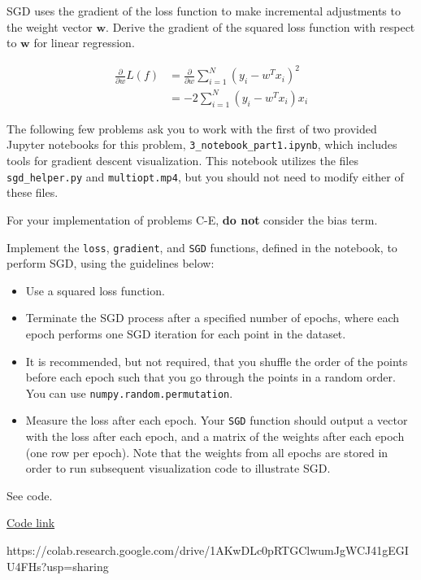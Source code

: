 \begin{problem}[2]
  SGD uses the gradient of the loss function to make incremental adjustments to the weight vector $\mathbf{w}$. Derive the gradient of the squared loss function with respect to $\mathbf{w}$ for linear regression.
\end{problem}
\begin{solution}
  \begin{align*}
    \frac{\partial}{\partial w} L(f) &= \frac{\partial}{\partial w} \sum_{i=1}^{N} (y_i - w^T x_i)^2 \\
    &= -2 \sum_{i=1}^N (y_i - w^T x_i) x_i
  \end{align*}
\end{solution}

The following few problems ask you to work with the first of two provided Jupyter notebooks for this problem, \texttt{3_notebook_part1.ipynb}, which includes tools for gradient descent visualization. This notebook utilizes the files \texttt{sgd_helper.py} and \texttt{multiopt.mp4}, but you should not need to modify either of these files. 

For your implementation of problems C-E, \textbf{do not} consider the bias term.

\begin{problem}[8]
  Implement the \texttt{loss}, \texttt{gradient}, and \texttt{SGD} functions, defined in the notebook, to perform SGD, using the guidelines below:

  \begin{itemize}
    \item Use a squared loss function.
    \item Terminate the SGD process after a specified number of epochs, where each epoch performs one SGD iteration for each point in the dataset.
    \item It is recommended, but not required, that you shuffle the order of the points before each epoch such that you go through the points in a random order. You can use \texttt{numpy.random.permutation}.
    \item Measure the loss after each epoch. Your \texttt{SGD} function should output a vector with the loss after each epoch, and a matrix of the weights after each epoch (one row per epoch). Note that the weights from all epochs are stored in order to run subsequent visualization code to illustrate SGD.
  \end{itemize}
\end{problem}
\begin{solution}
See code. %

\href{https://colab.research.google.com/drive/1AKwDLc0pRTGClwumJgWCJ41gEGIU4FHs?usp=sharing}{Code link}

https://colab.research.google.com/drive/1AKwDLc0pRTGClwumJgWCJ41gEGIU4FHs?usp=sharing

\end{solution}

